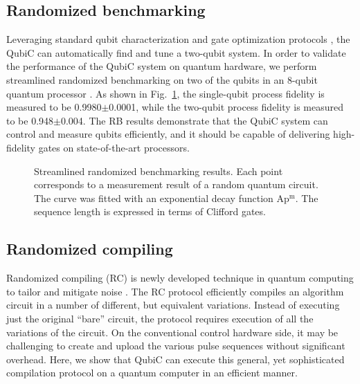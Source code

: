 \documentclass{ieeetran}
\begin{document}
\subsection{Randomized benchmarking}
Leveraging standard qubit characterization and gate optimization protocols \cite{xu2021automatic}, the QubiC can automatically find and tune a two-qubit system. 
In order to validate the performance of the QubiC system on quantum hardware, we perform streamlined randomized benchmarking \cite{magesan2011scalable} on two of the qubits in an 8-qubit quantum processor \cite{blok2021quantum}. 
As shown in Fig.~\ref{fig:rb}, the single-qubit process fidelity \cite{emerson2005scalable,dankert2009exact} is measured to be 0.9980$\pm$0.0001, while the two-qubit process fidelity is measured to be 0.948$\pm$0.004. 
The RB results demonstrate that the QubiC system can control and measure qubits efficiently, and it should be capable of delivering high-fidelity gates on state-of-the-art processors.

\begin{figure}[t!]
\centering
{}
\vfil
{}
\caption{Streamlined randomized benchmarking results. Each point corresponds to a measurement result of a random quantum circuit. The curve was fitted with an exponential decay function $\mathrm{A}\mathrm{p}^\mathrm{m}$. The sequence length is expressed in terms of Clifford gates.}
\label{fig:rb}
\end{figure}

\subsection{Randomized compiling}
Randomized compiling (RC) is newly developed technique in quantum computing to tailor and mitigate noise \cite{wallman2016noise,ware2018experimental}.
The RC protocol efficiently compiles an algorithm circuit in a number of different, but equivalent variations. 
Instead of executing just the original ``bare'' circuit, the protocol requires execution of all the variations of the circuit. 
On the conventional control hardware side, it may be challenging to create and upload the various pulse sequences without significant overhead. 
Here, we show that QubiC can execute this general, yet sophisticated compilation protocol on a quantum computer in an efficient manner. 
\end{document}
